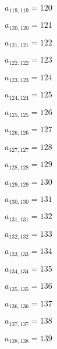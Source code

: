 \documentclass[a4paper,12pt]{article}
\begin{document}
$a _{ 119, 119 } = 120$

$a _{ 120, 120 } = 121$

$a _{ 121, 121 } = 122$

$a _{ 122, 122 } = 123$

$a _{ 123, 123 } = 124$

$a _{ 124, 124 } = 125$

$a _{ 125, 125 } = 126$

$a _{ 126, 126 } = 127$

$a _{ 127, 127 } = 128$

$a _{ 128, 128 } = 129$

$a _{ 129, 129 } = 130$

$a _{ 130, 130 } = 131$

$a _{ 131, 131 } = 132$

$a _{ 132, 132 } = 133$

$a _{ 133, 133 } = 134$

$a _{ 134, 134 } = 135$

$a _{ 135, 135 } = 136$

$a _{ 136, 136 } = 137$

$a _{ 137, 137 } = 138$

$a _{ 138, 138 } = 139$
\end{document}
